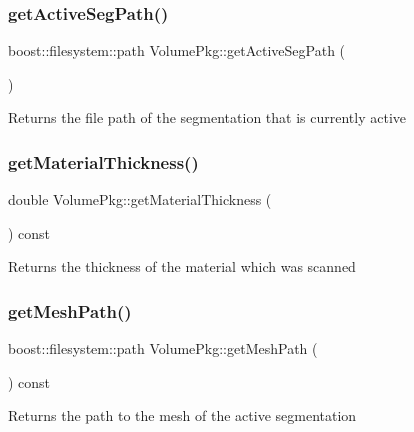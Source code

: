 \subsubsection{\texorpdfstring{get\+Active\+Seg\+Path()}{getActiveSegPath()}}
{\footnotesize\ttfamily boost\+::filesystem\+::path Volume\+Pkg\+::get\+Active\+Seg\+Path (\begin{DoxyParamCaption}{ }\end{DoxyParamCaption})}

\begin{DoxyReturn}{Returns}
the file path of the segmentation that is currently active 
\end{DoxyReturn}
\hypertarget{classVolumePkg_a84a0f3f538667094dc498124f0eb548c}{}\label{classVolumePkg_a84a0f3f538667094dc498124f0eb548c} 
\subsubsection{\texorpdfstring{get\+Material\+Thickness()}{getMaterialThickness()}}
{\footnotesize\ttfamily double Volume\+Pkg\+::get\+Material\+Thickness (\begin{DoxyParamCaption}{ }\end{DoxyParamCaption}) const}

\begin{DoxyReturn}{Returns}
the thickness of the material which was scanned 
\end{DoxyReturn}
\hypertarget{classVolumePkg_a07589ed2f04df55a01be45fe1f5dc87f}{}\label{classVolumePkg_a07589ed2f04df55a01be45fe1f5dc87f} 
\subsubsection{\texorpdfstring{get\+Mesh\+Path()}{getMeshPath()}}
{\footnotesize\ttfamily boost\+::filesystem\+::path Volume\+Pkg\+::get\+Mesh\+Path (\begin{DoxyParamCaption}{ }\end{DoxyParamCaption}) const}

\begin{DoxyReturn}{Returns}
the path to the mesh of the active segmentation 
\end{DoxyReturn}
\hypertarget{classVolumePkg_a0c42b917841dd44d5c9de641fadd2a94}{}\label{classVolumePkg_a0c42b917841dd44d5c9de641fadd2a94} 
